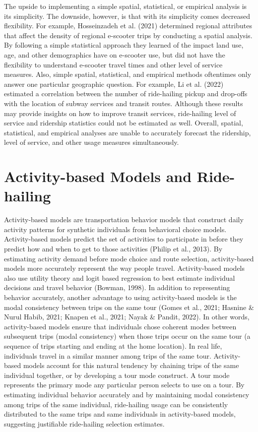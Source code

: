 \documentclass[fancy, masters]{byuthesis}
\begin{document}
The upside to implementing a simple spatial, statistical, or empirical analysis is its simplicity. The downside, however, is that with its simplicity comes decreased flexibility. For example, Hosseinzadeh et al. (2021) determined regional attributes that affect the density of regional e-scooter trips by conducting a spatial analysis. By following a simple statistical approach they learned of the impact land use, age, and other demographics have on e-scooter use, but did not have the flexibility to understand e-scooter travel times and other level of service measures. Also, simple spatial, statistical, and empirical methods oftentimes only answer one particular geographic question. For example, Li et al. (2022) estimated a correlation between the number of ride-hailing pickup and drop-offs with the location of subway services and transit routes. Although these results may provide insights on how to improve transit services, ride-hailing level of service and ridership statistics could not be estimated as well. Overall, spatial, statistical, and empirical analyses are unable to accurately forecast the ridership, level of service, and other usage measures simultaneously.

\hypertarget{lit-abm}{%
\section{Activity-based Models and Ride-hailing}\label{lit-abm}}

Activity-based models are transportation behavior models that construct daily activity patterns for synthetic individuals from behavioral choice models. Activity-based models predict the set of activities to participate in before they predict how and when to get to those activities (Philip et al., 2013). By estimating activity demand before mode choice and route selection, activity-based models more accurately represent the way people travel. Activity-based models also use utility theory and logit based regression to best estimate individual decisions and travel behavior (Bowman, 1998). In addition to representing behavior accurately, another advantage to using activity-based models is the modal consistency between trips on the same tour (Gomes et al., 2021; Hasnine \& Nurul Habib, 2021; Knapen et al., 2021; Nayak \& Pandit, 2022). In other words, activity-based models ensure that individuals chose coherent modes between subsequent trips (modal consistency) when those trips occur on the same tour (a sequence of trips starting and ending at the home location). In real life, individuals travel in a similar manner among trips of the same tour. Activity-based models account for this natural tendency by chaining trips of the same individual together, or by developing a tour mode construct. A tour mode represents the primary mode any particular person selects to use on a tour. By estimating individual behavior accurately and by maintaining modal consistency among trips of the same individual, ride-hailing usage can be consistently distributed to the same trips and same individuals in activity-based models, suggesting justifiable ride-hailing selection estimates.
\end{document}
